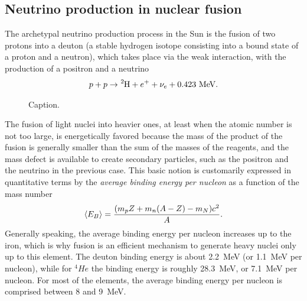 \subsection{Neutrino production in nuclear fusion}

The archetypal neutrino production process in the Sun is the fusion of two protons
into a deuton (a stable hydrogen isotope consisting into a bound state of a
proton and a neutron), which takes place via the weak interaction, with the production
of a positron and a neutrino
\begin{align}\label{eq:deuton_fusion}
  p + p \rightarrow \ce{^2H} + e^+ + \nu_e + 0.423~\text{MeV}.
\end{align}

\begin{figure}[!htbp]
  
  \caption{Caption.}
  \label{fig:nucleon_binding_energy}
\end{figure}

The fusion of light nuclei into heavier ones, at least when the atomic number is
not too large, is energetically favored because the mass of the product of the fusion
is generally smaller than the sum of the masses of the reagents, and the mass
defect is available to create secondary particles, such as the positron and the
neutrino in the previous case. This basic notion is customarily expressed in
quantitative terms by the \emph{average binding energy per nucleon} as a function
of the mass number
\begin{align*}
  \left<E_B\right> = \frac{(m_p Z + m_n(A - Z) - m_N)c^2}{A}.
\end{align*}
Generally speaking, the average binding energy per nucleon increases up to the iron,
which is why fusion is an efficient mechanism to generate heavy nuclei only up
to this element. The deuton binding energy is about 2.2~MeV (or 1.1~MeV per nucleon),
while for ${^4}He$ the binding energy is roughly 28.3~MeV, or 7.1~MeV per nucleon.
For most of the elements, the average binding energy per nucleon is comprised
between 8 and 9~MeV.

